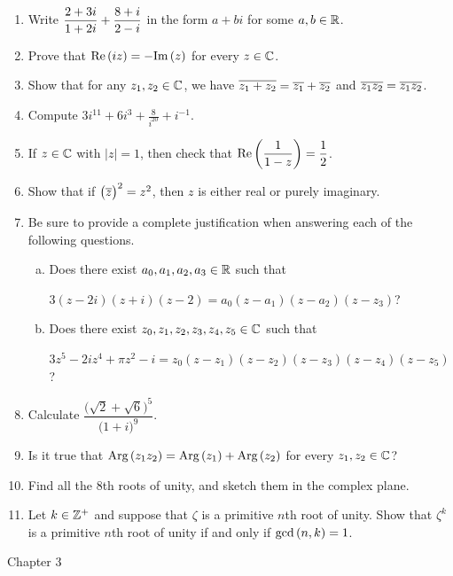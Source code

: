 \documentclass[11pt,fleqn,dvipsnames,usenames]{article}
\begin{document}
\begin{enumerate}
\item Write $\displaystyle{\frac{2 + 3i}{1 + 2i} + \frac{8+i}{2-i}}$ in the form $a+bi$ for some $a,b\in\mathbb{R}$.
\item Prove that $\text{Re}\left(iz\right) = -\text{Im}\left(z\right)$ for every $z\in\mathbb{C}$.
\item Show that for any $z_{1},z_{2}\in\mathbb{C}$, we have $\overline{z_{1} + z_{2}} = \overline{z_{1}} + \overline{z_{2}}$ and $\overline{z_{1}z_{2}} = \overline{z_{1}}\overline{z_{2}}$.
\item Compute $3i^{11} + 6i^{3} + \frac{8}{i^{20}} + i^{-1}$.
\item If $z\in\mathbb{C}$ with $|z| = 1$, then check that $\text{Re}\left(\dfrac{1}{1-z}\right) = \dfrac{1}{2}$.
\item Show that if $\big(\overline{z}\big)^2 = z^2$, then $z$ is either real or purely imaginary.
\item Be sure to provide a complete justification when answering each of the following questions.
\begin{enumerate}[(a)]
\item Does there exist $a_{0},a_{1},a_{2},a_{3}\in \mathbb{R}$ such that
\begin{center}
$3(z-2i)(z+i)(z-2) = a_{0}(z-a_{1})(z - a_{2})(z - z_{3})$?
\end{center}
\item Does there exist $z_{0},z_{1},z_{2},z_{3},z_{4},z_{5}\in \mathbb{C}$ such that
\begin{center}
$3z^5 - 2iz^4 + \pi z^2 - i = z_{0}(z - z_{1})(z - z_{2})(z - z_{3})(z - z_{4})(z - z_{5})$?
\end{center}
\end{enumerate}
\item Calculate $\dfrac{\big(\sqrt{2} + \sqrt{6}\big)^5}{\big(1+i\big)^9}$.
\item Is it true that $\text{Arg}\left(z_1z_2\right) = \text{Arg}\left(z_1\right) + \text{Arg}\left(z_2\right)$ for every $z_{1},z_{2}\in\mathbb{C}$?
\item Find all the $8$th roots of unity, and sketch them in the complex plane.
\item Let $k\in\mathbb{Z}^{+}$ and suppose that $\zeta$ is a primitive $n$th root of unity.  Show that $\zeta^{k}$ is a primitive $n$th root of unity if and only if $\text{gcd}\left(n,k\right) = 1$.
\end{enumerate}
\vsp

{\huge Chapter 3}
\vsp
\end{document}
